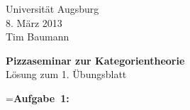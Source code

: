 \documentclass[a4paper,ngerman]{scrartcl}
\theoremstyle{definition}
\theoremstyle{plain}
\theoremstyle{remark}
\begin{document}
\vspace*{-4em}
\begin{flushright}Universität Augsburg \\ 8. März 2013 \\ Tim Baumann\end{flushright}

\begin{center}\Large \textbf{Pizzaseminar zur Kategorientheorie} \\
Lösung zum 1. Übungsblatt
\end{center}
\vspace{2em}

\newbox{\mybox}
\setbox\mybox=\hbox{\textbf{Aufgabe 1:}}

\end{document}

